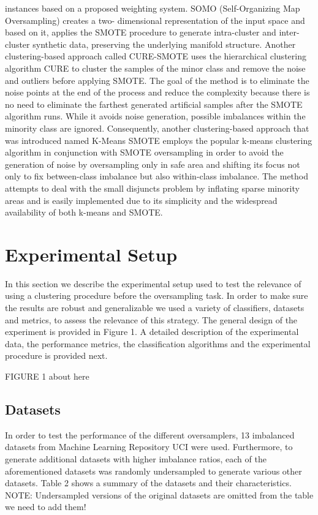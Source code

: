 \documentclass[parskip=full]{scrartcl}
\begin{document}
instances based on a proposed weighting system. SOMO (Self-Organizing Map
Oversampling) \cite{Douzas2017a} creates a two- dimensional representation of
the input space and based on it, applies the SMOTE procedure to generate
intra-cluster and inter-cluster synthetic data, preserving the underlying
manifold structure. Another clustering-based approach called CURE-SMOTE
\cite{Ma2017} uses the hierarchical clustering algorithm CURE to cluster the
samples of the minor class and remove the noise and outliers before applying
SMOTE. The goal of the method is to eliminate the noise points at the end of the
process and reduce the complexity because there is no need to eliminate the
farthest generated artificial samples after the SMOTE algorithm runs. While it
avoids noise generation, possible imbalances within the minority class are
ignored. Consequently, another clustering-based approach that was introduced
named K-Means SMOTE \cite{Douzas2018} employs the popular k-means clustering
algorithm in conjunction with SMOTE oversampling in order to avoid the
generation of noise by oversampling only in safe area and shifting its focus not
only to fix between-class imbalance but also within-class imbalance. The method
attempts to deal with the small disjuncts problem by inflating sparse minority
areas and is easily implemented due to its simplicity and the widespread
availability of both k-means and SMOTE.

\section{Experimental Setup}

In this section we describe the experimental setup used to test the relevance of
using a clustering procedure before the oversampling task. In order to make sure
the results are robust and generalizable we used a variety of classifiers,
datasets and metrics, to assess the relevance of this strategy. The general
design of the experiment is provided in Figure 1. A detailed description of the
experimental data, the performance metrics, the classification algorithms and
the experimental procedure is provided next.

FIGURE 1 about here

\subsection{Datasets}

In order to test the performance of the different oversamplers, 13 imbalanced
datasets from Machine Learning Repository UCI were used. Furthermore, to
generate additional datasets with higher imbalance ratios, each of the
aforementioned datasets was randomly undersampled to generate various other
datasets. Table 2 shows a summary of the datasets and their characteristics.
NOTE: Undersampled versions of the original datasets are omitted from the table
we need to add them!
\end{document}
